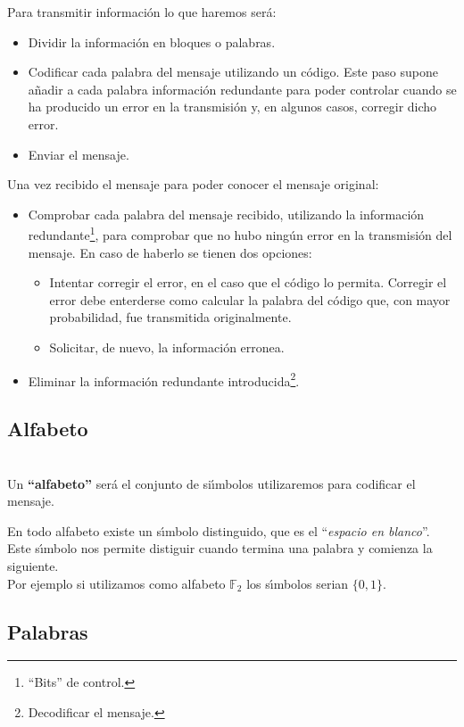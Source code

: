Para transmitir informaci\'on lo que haremos ser\'a:
\begin{itemize}
\item Dividir la informaci\'on en bloques o palabras.
\item Codificar cada palabra del mensaje utilizando un c\'odigo. Este paso
supone a\~nadir a cada palabra informaci\'on redundante para poder controlar
cuando se ha producido un error en la transmisi\'on y, en algunos casos,
corregir dicho error.
\item Enviar el mensaje.
\end{itemize}
%
Una vez recibido el mensaje para poder conocer el mensaje original:
\begin{itemize}
\item Comprobar cada palabra del mensaje recibido, utilizando la informaci\'on
redundante\footnote{``Bits'' de control.}, para comprobar que no hubo ning\'un
error en la transmisi\'on del mensaje. En caso de haberlo se tienen dos
opciones:
\begin{itemize}
\item Intentar corregir el error, en el caso que el c\'odigo lo permita.
Corregir el error debe enterderse como calcular la palabra del c\'odigo que,
con mayor probabilidad, fue transmitida originalmente.
\item Solicitar, de nuevo, la informaci\'on erronea.
\end{itemize}
\item Eliminar la informaci\'on redundante introducida\footnote{Decodificar el
mensaje.}.
\end{itemize}

\subsection{Alfabeto}

\begin{definicion}[Alfabeto]
\ \\
Un \textbf{``alfabeto''} ser\'a el conjunto de si\'{\i}mbolos utilizaremos
para codificar el mensaje.
\end{definicion}
En todo alfabeto existe un s\'{\i}mbolo distinguido, que es el ``\emph{espacio
en blanco}''. Este s\'{\i}mbolo nos permite distiguir cuando termina una palabra
y comienza la siguiente.\\

Por ejemplo si utilizamos como alfabeto $\mathbb{F}_2$ los s\'{\i}mbolos 
serian $\{0,1\}$.

\subsection{Palabras}

